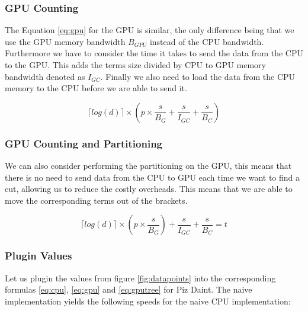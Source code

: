 \documentclass[]{article}
\begin{document}
\subsubsection{GPU Counting}


The Equation \ref{eq:gpu} for the GPU is similar, the only difference being that we use the GPU memory bandwidth $B_{GPU}$ instead of the CPU bandwidth. Furthermore we have to consider the time it takes to send the data from the CPU to the GPU. This adds the terms size divided by CPU to GPU memory bandwidth denoted as $I_{GC}$. Finally we also need to load the data from the CPU memory to the CPU before we are able to send it. 

\begin{center}
	\begin{equation}
			\lceil log(d) \rceil \times \left ( p \times \frac{s}{B_{G}} + \frac{s}{I_{GC}}  + \frac{s}{B_{C}} \right )
		\label{eq:gpu}
	\end{equation}
\end{center}


\subsubsection{GPU Counting and Partitioning}\label{gpu-tree-building}

We can also consider performing the partitioning on the GPU, this means that there is no need to send data from the CPU to GPU each time we want to find a cut, allowing us to reduce the costly overheads. This means that we are able to move the corresponding terms out of the brackets. 

\begin{center}
	\begin{equation}
		\lceil log(d) \rceil \times \left ( p \times \frac{s}{B_{G}} \right ) + \frac{s}{I_{GC}} + \frac{s}{B_{C}} = t
		\label{eq:gputree}
	\end{equation}
\end{center}

\newcommand\s{12}

\newcommand\p{32}


\normalfont
\subsubsection{Plugin Values} 

Let us plugin the values from figure \ref{fig:datapoints} into the corresponding formulas \ref{eq:cpu}, \ref{eq:gpu} and \ref{eq:gputree} for Piz Daint.
The naive implementation yields the following speeds for the naive CPU  implementation:
\end{document}

